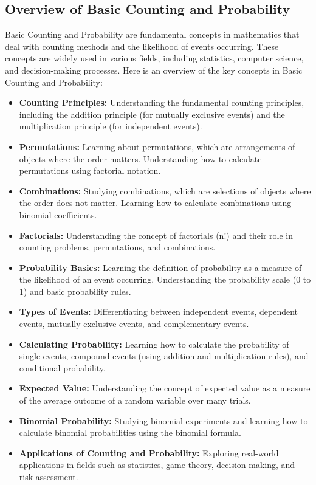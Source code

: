 \documentclass[openany]{book}
\begin{document}
\subsection{Overview of Basic Counting and Probability}
Basic Counting and Probability are fundamental concepts in mathematics that deal with counting methods and the likelihood of events occurring. These concepts are widely used in various fields, including statistics, computer science, and decision-making processes. Here is an overview of the key concepts in Basic Counting and Probability:
\begin{itemize}
    \item \textbf{Counting Principles:} Understanding the fundamental counting principles, including the addition principle (for mutually exclusive events) and the multiplication principle (for independent events).
    \item \textbf{Permutations:} Learning about permutations, which are arrangements of objects where the order matters. Understanding how to calculate permutations using factorial notation.
    \item \textbf{Combinations:} Studying combinations, which are selections of objects where the order does not matter. Learning how to calculate combinations using binomial coefficients.
    \item \textbf{Factorials:} Understanding the concept of factorials (n!) and their role in counting problems, permutations, and combinations.
    \item \textbf{Probability Basics:} Learning the definition of probability as a measure of the likelihood of an event occurring. Understanding the probability scale (0 to 1) and basic probability rules.
    \item \textbf{Types of Events:} Differentiating between independent events, dependent events, mutually exclusive events, and complementary events.
    \item \textbf{Calculating Probability:} Learning how to calculate the probability of single events, compound events (using addition and multiplication rules), and conditional probability.
    \item \textbf{Expected Value:} Understanding the concept of expected value as a measure of the average outcome of a random variable over many trials.
    \item \textbf{Binomial Probability:} Studying binomial experiments and learning how to calculate binomial probabilities using the binomial formula.
    \item \textbf{Applications of Counting and Probability:} Exploring real-world applications in fields such as statistics, game theory, decision-making, and risk assessment.
\end{itemize}
\end{document}
